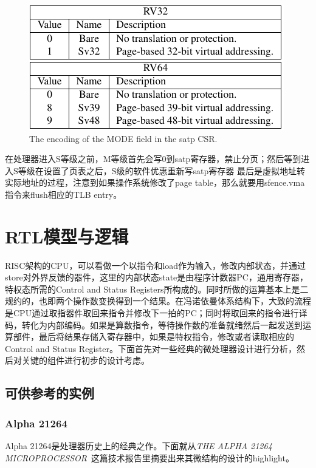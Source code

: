\documentclass{article}
\begin{document}
\begin{enumerate}
\begin{figure}[H]
	\end{figure}
	\begin{figure}[H]
		\centering
		\includegraphics[width=0.4\linewidth]{figs/MODE.png}
		\captionsetup{labelformat=empty}
		\caption{The encoding of the MODE field in the satp CSR.~\cite{privileged}}
	\end{figure}
	在处理器进入S等级之前，M等级首先会写0到satp寄存器，禁止分页；然后等到进入S等级在设置了页表之后，S级的软件优惠重新写satp寄存器
	最后是虚拟地址转实际地址的过程，注意到如果操作系统修改了page table，那么就要用sfence.vma指令来flush相应的TLB entry。
\end{enumerate}

\section{RTL模型与逻辑}
RISC架构的CPU，可以看做一个以指令和load作为输入，修改内部状态，并通过store对外界反馈的器件，这里的内部状态state是由程序计数器PC，通用寄存器，特权态所需的Control and Status Registers所构成的。同时所做的运算基本上是二规约的，也即两个操作数变换得到一个结果。在冯诺依曼体系结构下，大致的流程是CPU通过取指器件取回来指令并修改下一拍的PC；同时将取回来的指令进行译码，转化为内部编码。如果是算数指令，等待操作数的准备就绪然后一起发送到运算部件，最后将结果存储入寄存器中，如果是特权指令，修改或者读取相应的Control and Status Register。下面首先对一些经典的微处理器设计进行分析，然后对关键的组件进行初步的设计考虑。

\subsection{可供参考的实例}
	\subsubsection{Alpha 21264}
		Alpha 21264是处理器历史上的经典之作。下面就从\textit{THE ALPHA 21264 MICROPROCESSOR}~\cite{alpha}这篇技术报告里摘要出来其微结构的设计的highlight。
		
\end{document}
